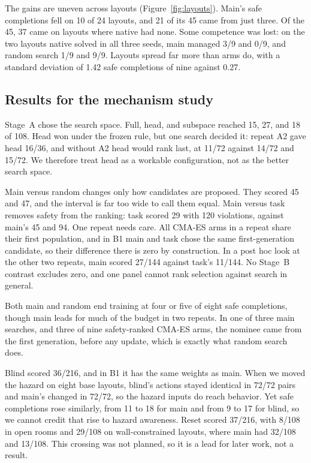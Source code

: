 \documentclass[dvipsnames,format=sigconf]{acmart}
\newcommand{\cmaes}{CMA-ES}
\begin{document}
The gains are uneven across layouts (Figure~\ref{fig:layouts}). Main's safe completions fell on 10 of 24
layouts, and 21 of its 45 came from just three. Of the 45, 37 came on layouts where native had none. Some
competence was lost: on the two layouts native solved in all three seeds, main managed 3/9 and 0/9, and
random search 1/9 and 9/9. Layouts spread far more than arms do, with a standard deviation of 1.42 safe
completions of nine against 0.27.

\subsection{Results for the mechanism study}

Stage~A chose the search space. Full, head, and subspace reached 15, 27, and 18 of 108. Head won under the
frozen rule, but one search decided it: repeat A2 gave head 16/36, and without A2 head would rank last, at
11/72 against 14/72 and 15/72. We therefore treat head as a workable configuration, not as the better
search space.

Main versus random changes only how candidates are proposed. They scored 45 and 47, and the interval is
far too wide to call them equal. Main versus task removes safety from the ranking: task scored 29 with 120
violations, against main's 45 and 94. One repeat needs care. All \cmaes{} arms in a repeat share their first
population, and in B1 main and task chose the same first-generation candidate, so their difference there
is zero by construction. In a post hoc look at the other two repeats, main scored 27/144 against task's
11/144. %
No Stage~B contrast excludes zero, and one panel cannot rank selection against search in general.

Both main and random end training at four or five of eight safe completions, though main leads for much
of the budget in two repeats. In one of three main searches, and three of nine safety-ranked \cmaes{} arms,
the nominee came from the first generation, before any update, which is exactly what random search does.

Blind scored 36/216, and in B1 it has the same weights as main. When we moved the hazard on eight base
layouts, blind's actions stayed identical in 72/72 pairs and main's changed in 72/72, so the hazard inputs do
reach behavior. Yet safe completions rose similarly, from 11 to 18 for main and from 9 to 17 for blind, so we
cannot credit that rise to hazard awareness. Reset scored 37/216, with 8/108 in open rooms and 29/108 on
wall-constrained layouts, where main had 32/108 and 13/108. This crossing was not planned, so it is a lead
for later work, not a result.
\end{document}
